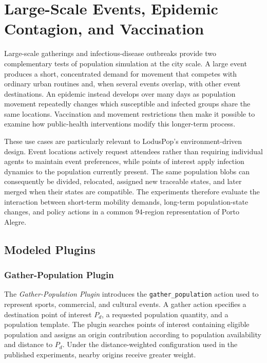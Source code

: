 \section{Large-Scale Events, Epidemic Contagion, and Vaccination}
\label{sec:results_large_scale_events_epidemics}

Large-scale gatherings and infectious-disease outbreaks provide two complementary tests of population simulation at the city scale. A large event produces a short, concentrated demand for movement that competes with ordinary urban routines and, when several events overlap, with other event destinations. An epidemic instead develops over many days as population movement repeatedly changes which susceptible and infected groups share the same locations. Vaccination and movement restrictions then make it possible to examine how public-health interventions modify this longer-term process.

These use cases are particularly relevant to LodusPop's environment-driven design. Event locations actively request attendees rather than requiring individual agents to maintain event preferences, while points of interest apply infection dynamics to the population currently present. The same population blobs can consequently be divided, relocated, assigned new traceable states, and later merged when their states are compatible. The experiments therefore evaluate the interaction between short-term mobility demands, long-term population-state changes, and policy actions in a common 94-region representation of Porto Alegre.

\subsection{Modeled Plugins}
\label{sec:large_scale_epidemic_plugins}

\subsubsection{Gather-Population Plugin}

The \textit{Gather-Population Plugin} introduces the \texttt{gather\_population} action used to represent sports, commercial, and cultural events. A gather action specifies a destination point of interest $P_d$, a requested population quantity, and a population template. The plugin searches points of interest containing eligible population and assigns an origin contribution according to population availability and distance to $P_d$. Under the distance-weighted configuration used in the published experiments, nearby origins receive greater weight.

